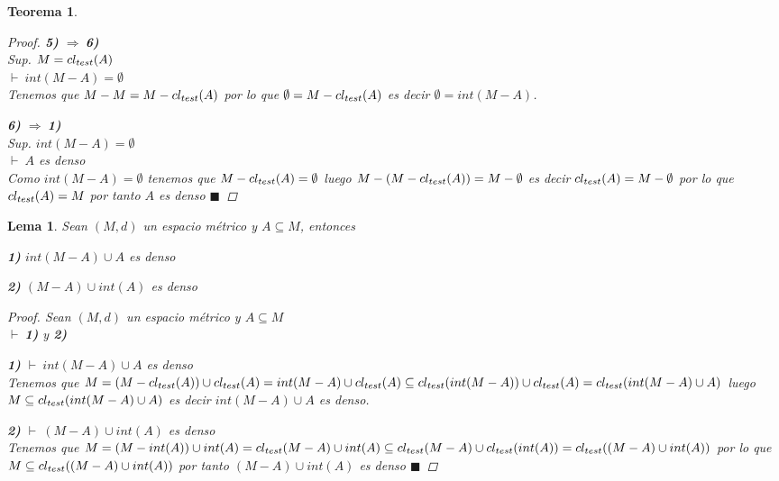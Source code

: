 \documentclass[oneside]{book} %
\theoremstyle{Teorema}
\newtheorem{Teorema}[Definicion]{Teorema}
\newtheorem{Lema}[Definicion]{Lema}
\theoremstyle{Ejemplos}
\theoremstyle{[Obs]}
\def \test {test}
\newcommand{\cerradura}[2][\test]{\ifx \test #1 {\overline{#2}} \else {cl_{#1}(#2)} \fi} %
\renewcommand{\{}{\left\lbrace} %
\renewcommand{\}}{\right\rbrace} %
\renewcommand{\u}{\cup} %
\renewcommand{\sc}{\subseteq} %
\renewcommand{\qed}{$\blacksquare$} %
\newcommand{\pd}{$\vdash\ $} %
\newcommand{\Imp}{$\Rightarrow\ $} %
\begin{document}
\begin{Teorema}
\begin{proof}
					\textbf{5)} \Imp \textbf{6)} \\ 
					Sup. $M = \cerradura{A}$ \\
					\pd $int(M - A) = \emptyset$ \\ 
					Tenemos que $M - M = M - \cerradura{A}$ por lo que $\emptyset = M - \cerradura{A}$ es decir $\emptyset = int(M - A)$.

					\textbf{6)} \Imp \textbf{1)} \\ 
					Sup. $int(M - A) = \emptyset$ \\ 
					\pd $A$ es denso \\ 
					Como $int(M - A) = \emptyset$ tenemos que $M - \cerradura{A} = \emptyset$ luego $M - (M - \cerradura{A}) = M - \emptyset$ es decir $\cerradura{A} = M - \emptyset$ por lo que $\cerradura{A} = M$ por tanto $A$ es denso \qed
 
				\end{proof}

			\end{Teorema}

			\begin{Lema}\setlength{\parindent}{0em}
				
				Sean $(M, d)$ un espacio métrico y $A \sc M$, entonces 

				\textbf{1)} $int(M - A) \u A$ es denso 

				\textbf{2)} $(M - A) \u int(A)$ es denso 

				\begin{proof}
					
					Sean $(M, d)$ un espacio métrico y $A \sc M$ \\ 
					\pd \textbf{1)} y \textbf{2)} 

					\textbf{1)} \pd $int(M - A) \u A$ es denso \\ 
					Tenemos que $M = (M - \cerradura{A}) \u \cerradura{A} = int(M - A) \u \cerradura{A} \sc \cerradura{int(M - A)} \u \cerradura{A} = \cerradura{int(M - A) \u A}$ luego $M \sc \cerradura{int(M - A) \u A}$ es decir $int(M - A) \u A$ es denso.

					\textbf{2)} \pd $(M - A) \u int(A)$ es denso \\ 
					Tenemos que $M = (M - int(A)) \u int(A) = \cerradura{M - A} \u int(A) \sc \cerradura{M - A} \u \cerradura{int(A)} = \cerradura{(M - A) \u int(A)}$ por lo que $M \sc \cerradura{(M - A) \u int(A)}$ por tanto $(M - A) \u int(A)$ es denso \qed

				\end{proof}

			\end{Lema}
\end{document}
